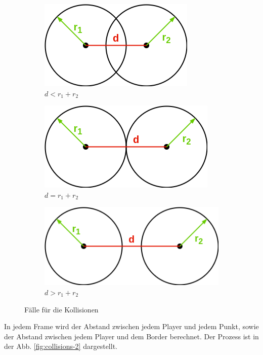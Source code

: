 \documentclass[doktyp=studarbeit]{TUBAFarbeiten}
\begin{document}
\begin{figure}[!htb]
    \centering
    \begin{subfigure}[b]{0.45\textwidth}
        \centering
        \includegraphics[height=0.1\textheight]{collisions-3.png}
        \caption{$d < r_{1} + r_{2}$}
    \end{subfigure}
    \qquad
    \begin{subfigure}[b]{0.45\textwidth}
        \centering
        \includegraphics[height=0.1\textheight]{collisions-4.png}
        \caption{$d = r_{1} + r_{2}$}
    \end{subfigure}
    \qquad
    \begin{subfigure}[b]{0.45\textwidth}
        \centering
        \includegraphics[height=0.1\textheight]{collisions-5.png}
        \caption{$d > r_{1} + r_{2}$}
    \end{subfigure}
    \caption{Fälle für die Kollisionen}
    \label{fig:collisions-1}
\end{figure}

\FloatBarrier
In jedem Frame wird der Abstand zwischen jedem Player und jedem Punkt,
sowie der Abstand zwischen jedem Player und dem Border berechnet. 
Der Prozess ist in der Abb. \ref{fig:collisions-2} dargestellt.
\end{document}
